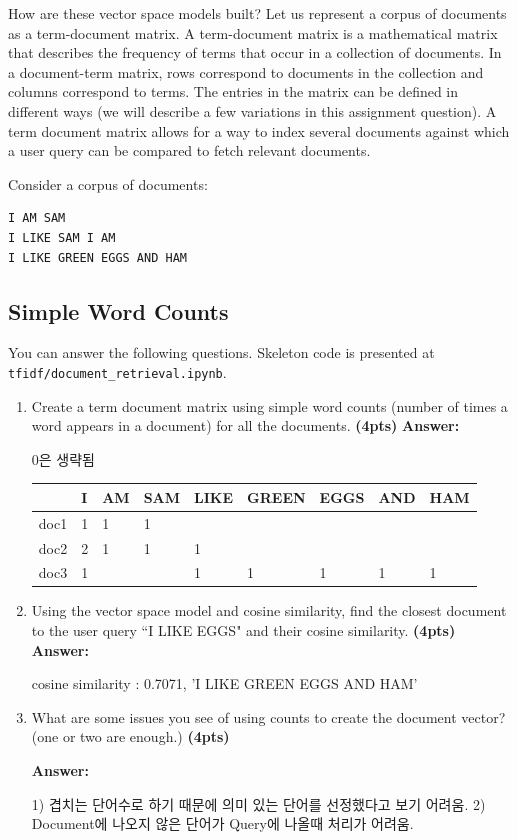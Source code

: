 \documentclass{assignment format}
\newenvironment{answer}{
    {\bf Answer:} \begingroup\color{red}
}{\endgroup}%
\begin{document}
How are these vector space models built?
Let us represent a corpus of documents as a term-document matrix.
A term-document matrix is a mathematical matrix that describes the frequency of terms that occur in a collection of documents. In a document-term matrix, rows correspond to documents in the collection and columns correspond to terms. The entries in the matrix can be defined in different ways (we will describe a few variations in this assignment question).
A term document matrix allows for a way to index several documents against which a user query can be compared to fetch relevant documents.

Consider a corpus of documents:
\begin{verbatim}
I AM SAM
I LIKE SAM I AM
I LIKE GREEN EGGS AND HAM
\end{verbatim}

\subsection{Simple Word Counts}
You can answer the following questions. Skeleton code is presented at \texttt{tfidf/document\_retrieval.ipynb}. 
\begin{enumerate}[label=(\alph*)]
    \item Create a term document matrix using simple word counts (number of times a word appears in a document) for all the documents.  \textbf{(4pts)}
        \begin{answer}
        0은 생략됨
\begin{table}[H]
\centering
\label{tab:my-table}
\begin{tabular}{|l|l|l|l|l|l|l|l|l|}
\hline
     & I & AM & SAM & LIKE & GREEN & EGGS & AND & HAM \\ \hline
doc1 & 1 &  1 &  1  &      &       &      &     &     \\ \hline
doc2 & 2 &  1 &  1  &   1  &       &      &     &     \\ \hline
doc3 & 1 &    &     &   1  &   1   &   1  &  1  &  1  \\ \hline
\end{tabular}
\end{table}
    \end{answer}
    \item Using the vector space model and cosine similarity, find the closest document to the user query ``I LIKE EGGS" and their cosine similarity. \textbf{(4pts)}
        \begin{answer}
        cosine similarity : 0.7071, 'I LIKE GREEN EGGS AND HAM'
    \end{answer}
    
    \item What are some issues you see of using counts to create the document vector? (one or two are enough.) \textbf{(4pts)}

        \begin{answer}
    1) 겹치는 단어수로 하기 때문에 의미 있는 단어를 선정했다고 보기 어려움. 2) Document에 나오지 않은 단어가 Query에 나올때 처리가 어려움.
    \end{answer}
\end{enumerate}
\end{document}
